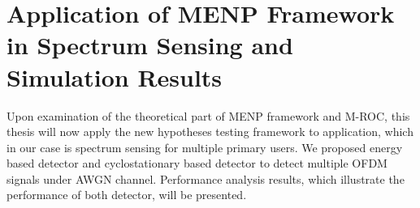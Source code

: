 \chapter{Application of MENP Framework in Spectrum Sensing and Simulation Results}
Upon examination of the theoretical part of MENP framework and M-ROC, this thesis will now apply the new hypotheses testing framework to application, which in our case is spectrum sensing for multiple primary users. We proposed energy based detector and cyclostationary based detector to detect multiple OFDM signals under AWGN channel. Performance analysis results, which illustrate the performance of both detector, will be presented. 

\typeout{}




\typeout{}

